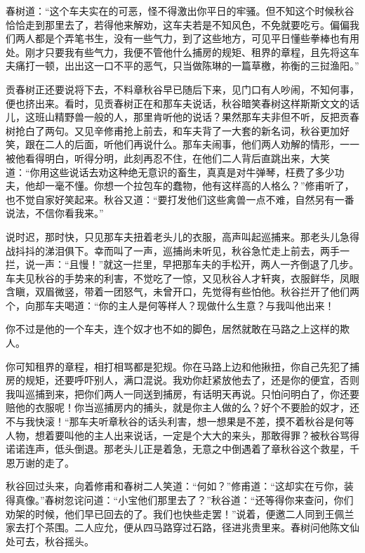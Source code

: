 \documentclass[12pt,UTF8]{ctexbook}
\begin{document}
{{{春树道：“这个车夫实在的可恶，怪不得激出你平日的牢骚。但不知这个时候秋谷恰恰走到那里去了，若得他来解劝，这车夫若是不知风色，不免就要吃亏。偏偏我们两人都是个弄笔书生，没有一些气力，到了这些地方，可见平日懂些拳棒也有用处。刚才只要我有些气力，我便不管他什么捕房的规矩、租界的章程，且先将这车夫痛打一顿，出出这一口不平的恶气，只当做陈琳的一篇草檄，祢衡的三挝渔阳。”

贡春树正还要说将下去，不料章秋谷早已随后下来，见门口有人吵闹，不知何事，便也挤出来。看时，见贡春树正在和那车夫说话，秋谷暗笑春树这样斯斯文文的话儿，这班山精野兽一般的人，那里肯听他的说话？果然那车夫非但不听，反把贡春树抢白了两句。又见辛修甫抢上前去，和车夫背了一大套的新名词，秋谷更加好笑，跟在二人的后面，听他们再说什么。那车夫闹事，他们两人劝解的情形，一一被他看得明白，听得分明，此刻再忍不住，在他们二人背后直跳出来，大笑道：“你用这些说话去劝这种绝无意识的畜生，真真是对牛弹琴，枉费了多少功夫，他却一毫不懂。你想一个拉包车的蠢物，他有这样高的人格么？”修甫听了，也不觉自家好笑起来。秋谷又道：“要打发他们这些禽兽一点不难，自然另有一番说法，不信你看我来。”

说时迟，那时快，只见那车夫扭着老头儿的衣服，高声叫起巡捕来。那老头儿急得战抖抖的涕泪俱下。幸而叫了一声，巡捕尚未听见，秋谷急忙走上前去，两手一拦，说一声：“且慢！”就这一拦里，早把那车夫的手松开，两人一齐倒退了几步。车夫见秋谷的手势来的利害，不觉吃了一惊，又见秋谷人才轩爽，衣服鲜华，凤眼含瞋，双眉微竖，带着一团怒气，未曾开口，先觉得有些怕他。秋谷拦开了他们两个，向那车夫喝道：“你的主人是何等样人？现做什么生意？与我叫他出来！

你不过是他的一个车夫，连个奴才也不如的脚色，居然就敢在马路之上这样的欺人。

你可知租界的章程，相打相骂都是犯规。你在马路上边和他揪扭，你自己先犯了捕房的规矩，还要呼吓别人，满口混说。我劝你赶紧放他去了，还是你的便宜，否则我叫巡捕到来，把你们两人一同送到捕房，有话明天再说。只怕问明白了，你还要赔他的衣服呢！你当巡捕房内的捕头，就是你主人做的么？好个不要脸的奴才，还不与我快滚！“那车夫听章秋谷的话头利害，想一想果是不差，摸不着秋谷是何等人物，想着要叫他的主人出来说话，一定是个大大的来头，那敢得罪？被秋谷骂得诺诺连声，低头倒退。那老头儿正是着急，无意之中倒遇着了章秋谷这个救星，千恩万谢的走了。

秋谷回过头来，向着修甫和春树二人笑道：“何如？”修甫道：“这却实在亏你，装得真像。”春树忽诧问道：“小宝他们那里去了？”秋谷道：“还等得你来查问，你们劝架的时候，他们早已回去的了。我们也快些走罢！”说着，便邀二人同到王佩兰家去打个茶围。二人应允，便从四马路穿过石路，径进兆贵里来。春树问他陈文仙处可去，秋谷摇头。

}}}
\end{document}
